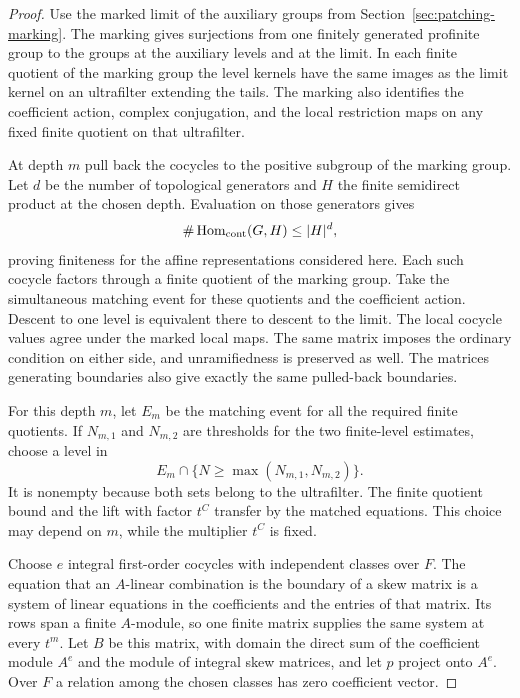 \begin{proof}
Use the marked limit of the auxiliary groups from
Section~\ref{sec:patching-marking}. The
marking gives surjections from one finitely generated
profinite group to the groups at the auxiliary levels
and at the limit. In each finite quotient of the marking
group the level kernels have the same images as the
limit kernel on an ultrafilter extending the tails.
The marking also identifies the coefficient action,
complex conjugation, and the local restriction maps
on any fixed finite quotient on that ultrafilter.

At depth \(m\) pull back the cocycles to the positive
subgroup of the marking group. Let \(d\) be the number of topological generators and \(H\) the finite semidirect product at the chosen depth. Evaluation on those generators gives
\[
 \#\operatorname{Hom}_{\rm cont}(G,H)\le |H|^d,
\]
proving finiteness for the affine representations considered here. Each such
cocycle factors through a finite quotient of the
marking group. Take the simultaneous matching event
for these quotients and the coefficient action.
Descent to one level is equivalent there to descent
to the limit. The local cocycle values agree under
the marked local maps. The same matrix imposes the ordinary condition on either side, and unramifiedness is preserved as well.
The matrices generating boundaries also give exactly
the same pulled-back boundaries.

For this depth \(m\), let \(E_m\) be the matching
event for all the required finite quotients. If
\(N_{m,1}\) and \(N_{m,2}\) are thresholds for the two
finite-level estimates, choose a level in
\[
                 E_m\cap\{N\ge\max(N_{m,1},N_{m,2})\}.
\]
It is nonempty because both sets belong to the ultrafilter.
The finite quotient bound and the lift with factor \(t^C\)
transfer by the matched equations. This choice may depend on
\(m\), while the multiplier \(t^C\) is fixed. \label{cor:ordinary-patching-cotangent-2}

Choose \(e\) integral first-order cocycles with independent
classes over \(F\). The equation that an \(A\)-linear
combination is the boundary of a skew matrix is a system
of linear equations in the coefficients and the entries of
that matrix. Its rows span a finite \(A\)-module, so one
finite matrix supplies the same system at every \(t^m\).
Let \(B\) be this matrix, with domain the direct sum of
the coefficient module \(A^e\) and the module of integral skew matrices,
and let \(p\) project onto \(A^e\). Over \(F\) a relation among the chosen classes has zero coefficient vector.


\end{proof}
